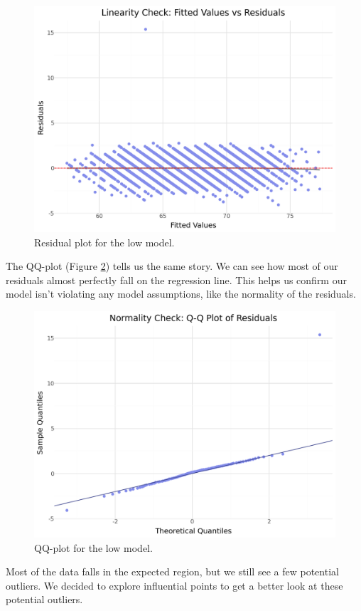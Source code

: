 \documentclass[twocolumn]{article} %
\begin{document}
\begin{figure}[h]
  \includegraphics[width=0.9\columnwidth]{8-linearity-check.png}
  \caption{Residual plot for the low model.}
  \label{8:low-residual}
\end{figure}

The QQ-plot (Figure \ref{9:low-qq}) tells us the same story. We can see how most of our residuals almost perfectly fall on the regression line. This helps us confirm our model isn't violating any model assumptions, like the normality of the residuals.

\begin{figure}[h]
  \includegraphics[width=0.9\columnwidth]{9-residual-qq-plot.png}
  \caption{QQ-plot for the low model.}
  \label{9:low-qq}
\end{figure}

Most of the data falls in the expected region, but we still see a few potential outliers. We decided to explore influential points to get a better look at these potential outliers.
\end{document}
